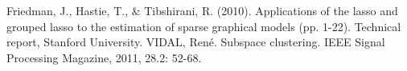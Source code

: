 \begin{thebibliography}{9}
    Friedman, J., Hastie, T., & Tibshirani, R. (2010). 
    Applications of the lasso and grouped lasso to the estimation of sparse graphical models (pp. 1-22). Technical report, Stanford University.
 VIDAL, René. Subspace clustering. IEEE Signal Processing Magazine, 2011, 28.2: 52-68.
\end{thebibliography}

